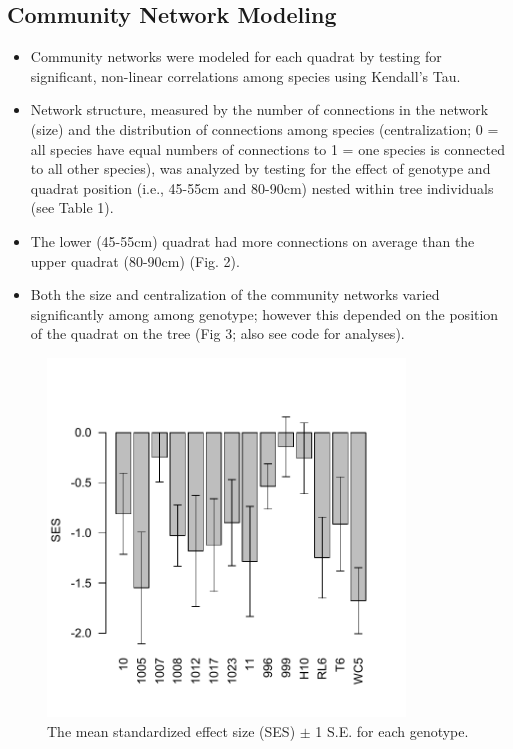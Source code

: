 \documentclass[11pt]{article}
\begin{document}
\subsection{Community Network Modeling}

\begin{itemize}
\item Community networks were modeled for each quadrat by testing for significant, non-linear correlations among species using Kendall's Tau.
\item Network structure, measured by the number of connections in the network (size) and the distribution of connections among species (centralization; 0 = all species have equal numbers of connections to 1 = one species is connected to all other species), was analyzed by testing for the effect of genotype and quadrat position (i.e., 45-55cm and 80-90cm) nested within tree individuals (see Table 1).
\item The lower (45-55cm) quadrat had more connections on average than the upper quadrat (80-90cm) (Fig. 2).
\item Both the size and centralization of the community networks varied significantly among among genotype; however this depended on the position of the quadrat on the tree (Fig 3; also see code for analyses).
\end{itemize}

\newpage

\begin{figure}[h]
\includegraphics[width=9.5cm,height=9.5cm]{fig1.pdf}
\caption{The mean standardized effect size (SES) $\pm$ 1 S.E. for each genotype.}
\end{figure}
\end{document}
